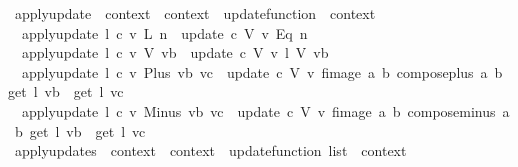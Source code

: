 \begin{isabellebody}
\ apply{\isacharunderscore}update\ {\isacharcolon}{\isacharcolon}\ {\isachardoublequoteopen}context\ {\isasymRightarrow}\ context\ {\isasymRightarrow}\ update{\isacharunderscore}function\ {\isasymRightarrow}\ context{\isachardoublequoteclose}\ \isanewline
\ \ {\isachardoublequoteopen}apply{\isacharunderscore}update\ l\ c\ {\isacharparenleft}v{\isacharcomma}\ {\isacharparenleft}L\ n{\isacharparenright}{\isacharparenright}\ {\isacharequal}\ update\ c\ {\isacharparenleft}V\ v{\isacharparenright}\ {\isacharbraceleft}{\isacharbar}{\isacharparenleft}Eq\ n{\isacharparenright}{\isacharbar}{\isacharbraceright}{\isachardoublequoteclose}\ {\isacharbar}\isanewline
\ \ {\isachardoublequoteopen}apply{\isacharunderscore}update\ l\ c\ {\isacharparenleft}v{\isacharcomma}\ V\ vb{\isacharparenright}\ {\isacharequal}\ update\ c\ {\isacharparenleft}V\ v{\isacharparenright}\ {\isacharparenleft}l\ {\isacharparenleft}V\ vb{\isacharparenright}{\isacharparenright}{\isachardoublequoteclose}\ {\isacharbar}\isanewline
\ \ {\isachardoublequoteopen}apply{\isacharunderscore}update\ l\ c\ {\isacharparenleft}v{\isacharcomma}\ Plus\ vb\ vc{\isacharparenright}\ {\isacharequal}\ update\ c\ {\isacharparenleft}V\ v{\isacharparenright}\ {\isacharparenleft}fimage\ {\isacharparenleft}{\isasymlambda}{\isacharparenleft}a{\isacharcomma}\ b{\isacharparenright}{\isachardot}\ compose{\isacharunderscore}plus\ a\ b{\isacharparenright}\ {\isacharparenleft}{\isacharparenleft}get\ l\ vb{\isacharparenright}\ {\isacharbar}{\isasymtimes}{\isacharbar}\ {\isacharparenleft}get\ l\ vc{\isacharparenright}{\isacharparenright}{\isacharparenright}{\isachardoublequoteclose}\ {\isacharbar}\isanewline
\ \ {\isachardoublequoteopen}apply{\isacharunderscore}update\ l\ c\ {\isacharparenleft}v{\isacharcomma}\ Minus\ vb\ vc{\isacharparenright}\ {\isacharequal}\ update\ c\ {\isacharparenleft}V\ v{\isacharparenright}\ {\isacharparenleft}fimage\ {\isacharparenleft}{\isasymlambda}{\isacharparenleft}a{\isacharcomma}\ b{\isacharparenright}{\isachardot}\ compose{\isacharunderscore}minus\ a\ b{\isacharparenright}\ {\isacharparenleft}{\isacharparenleft}get\ l\ vb{\isacharparenright}\ {\isacharbar}{\isasymtimes}{\isacharbar}\ {\isacharparenleft}get\ l\ vc{\isacharparenright}{\isacharparenright}{\isacharparenright}{\isachardoublequoteclose}\isanewline
\isanewline
{}\isamarkupfalse%
\ apply{\isacharunderscore}updates\ {\isacharcolon}{\isacharcolon}\ {\isachardoublequoteopen}context\ {\isasymRightarrow}\ context\ {\isasymRightarrow}\ update{\isacharunderscore}function\ list\ {\isasymRightarrow}\ context{\isachardoublequoteclose}\ \isanewline

\end{isabellebody}
